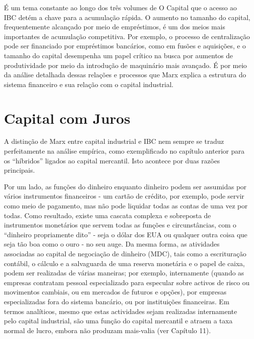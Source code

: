  \par 
É um tema constante ao longo dos três volumes de O Capital que o acesso ao IBC detém a chave para a acumulação rápida. O aumento no tamanho do capital, frequentemente alcançado por meio de empréstimos, é um dos meios mais importantes de acumulação competitiva. Por exemplo, o processo de centralização pode ser financiado por empréstimos bancários, como em fusões e aquisições, e o tamanho do capital desempenha um papel crítico na busca por aumentos de produtividade por meio da introdução de maquinário mais avançado. É por meio da análise detalhada dessas relações e processos que Marx explica a estrutura do sistema financeiro e sua relação com o capital industrial.
 \par 
\section{Capital com Juros}
 \par 
A distinção de Marx entre capital industrial e IBC nem sempre se traduz perfeitamente na análise empírica, como exemplificado no capítulo anterior para os “híbridos” ligados ao capital mercantil. Isto acontece por duas razões principais.
 \par 
Por um lado, as funções do dinheiro enquanto dinheiro podem ser assumidas por vários instrumentos financeiros - um cartão de crédito, por exemplo, pode servir como meio de pagamento, mas não pode liquidar todas as contas de uma vez por todas. Como resultado, existe uma cascata complexa e sobreposta de instrumentos monetários que servem todas as funções e circunstâncias, com o “dinheiro propriamente dito” - seja o dólar dos EUA ou qualquer outra coisa que seja tão boa como o ouro - no seu auge. Da mesma forma, as atividades associadas ao capital de negociação de dinheiro (MDC), tais como a escrituração contábil, o cálculo e a salvaguarda de uma reserva monetária e o papel de caixa, podem ser realizadas de várias maneiras; por exemplo, internamente (quando as empresas contratam pessoal especializado para especular sobre activos de risco ou movimentos cambiais, ou em mercados de futuros e opções), por empresas especializadas fora do sistema bancário, ou por instituições financeiras. Em termos analíticos, mesmo que estas actividades sejam realizadas internamente pelo capital industrial, são uma função do capital mercantil e atraem a taxa normal de lucro, embora não produzam mais-valia (ver Capítulo {\color{blue}11}).
 \par 
